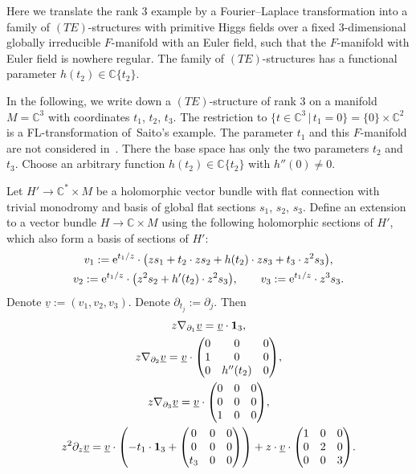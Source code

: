 \documentclass[10pt,a4paper]{amsart}
\numberwithin{equation}{section}
\numberwithin{figure}{section}
\newcommand{\C}{{\mathbb C}}
\newcommand{\uuuu}{\underline}
\newcommand{\paa}{\partial}
\newcommand{\nnn}{\nabla}
\begin{document}
Here we translate the rank 3 example
by a Fourier--Laplace transformation
into a family of $(TE)$-structures
with primitive Higgs fields over a fixed
3-dimensional globally irreducible
$F$-manifold with an Euler field, such that the
$F$-manifold with Euler field is nowhere regular.
The family of $(TE)$-structures has a functional parameter
$h(t_2)\in\C\{t_2\}$.

In the following, we write down a $(TE)$-structure of rank 3
on a manifold $M=\C^3$ with coordinates $t_1$, $t_2$, $t_3$.
The restriction to
$\big\{t\in\C^3\,|\, t_1=0\big\}=\{0\}\times \C^2$
is a FL-transformation of~Saito's example.
The parameter $t_1$ and this $F$-manifold are
not considered in~\cite{SaM17}. There the base
space has only the two parameters $t_2$ and $t_3$.
Choose an arbitrary function $h(t_2)\in\C\{t_2\}$
with $h''(0)\neq 0$.

Let $H'\to\C^*\times M$ be a holomorphic vector bundle
with flat connection with trivial monodromy and basis of
global flat sections $s_1$, $s_2$, $s_3$. Define an extension
to a vector bundle $H\to\C\times M$ using the following
holomorphic sections of $H'$, which also form a basis
of sections of $H'$:
\begin{gather*}%
v_1:= {\rm e}^{t_1/z}\cdot \big(zs_1+t_2\cdot zs_2+
h(t_2)\cdot zs_3+t_3\cdot z^2s_3\big),\\
v_2:= {\rm e}^{t_1/z}\cdot \big(z^2s_2+h'(t_2)\cdot z^2s_3\big),\qquad
v_3:= {\rm e}^{t_1/z}\cdot z^3s_3.\nonumber
\end{gather*}
Denote $\uuuu{v}:=(v_1,v_2,v_3)$.
Denote $\paa_{t_j}:=\paa_j$. Then
\begin{gather*}%
z\nnn_{\paa_1}\uuuu{v}= \uuuu{v}\cdot {\bf 1}_3,\\
z\nnn_{\paa_2}\uuuu{v}= \uuuu{v}\cdot
\begin{pmatrix}0&0&0\\1&0&0\\0&h''(t_2)&0\end{pmatrix}\!,
\nonumber\\
z\nnn_{\paa_3}\uuuu{v}= \uuuu{v}\cdot
\begin{pmatrix}0&0&0\\0&0&0\\1&0&0\end{pmatrix}\!,\nonumber\\
z^2\paa_z\uuuu{v}= \uuuu{v}\cdot
\left({-}t_1\cdot {\bf 1}_3
+\begin{pmatrix}0&0&0\\0&0&0\\t_3&0&0\end{pmatrix}\right)
+z\cdot\uuuu{v}\cdot
\begin{pmatrix}1&0&0\\0&2&0\\0&0&3\end{pmatrix}\!.\nonumber
\end{gather*}
\end{document}
